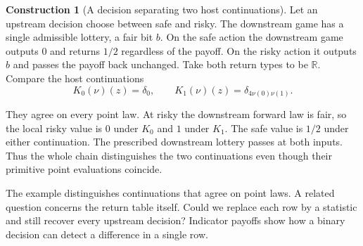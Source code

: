\documentclass[11pt,a4paper]{article}
\theoremstyle{definition}
\newtheorem*{construction}{Construction}
\begin{document}
\begin{construction}[A decision separating two host continuations]
    Let an upstream decision choose between safe and risky. The downstream game has a single admissible lottery, a fair bit $b$. On the safe action the downstream game outputs $0$ and returns $1/2$ regardless of the payoff. On the risky action it outputs $b$ and passes the payoff back unchanged. Take both return types to be $\mathbb R$. Compare the host continuations
    \[
        K_0(\nu)(z)=\delta_0,\qquad
        K_1(\nu)(z)=\delta_{4\nu(0)\nu(1)} .
    \]

    They agree on every point law. At risky the downstream forward law is fair, so the local risky value is $0$ under $K_0$ and $1$ under $K_1$. The safe value is $1/2$ under either continuation. The prescribed downstream lottery passes at both inputs. Thus the whole chain distinguishes the two continuations even though their primitive point evaluations coincide.
\end{construction}

The example distinguishes continuations that agree on point laws. A related question concerns the return table itself. Could we replace each row by a statistic and still recover every upstream decision? Indicator payoffs show how a binary decision can detect a difference in a single row.
\end{document}
